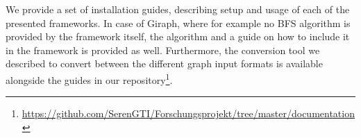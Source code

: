 \documentclass[a4paper]{IEEEtran}
\begin{document}
\appendix
\label{app:installationGuides}\label{app:conversionTool}
We provide a set of installation guides, describing setup and usage of each of the presented frameworks. In case of Giraph, where for example no BFS algorithm is provided by the framework itself, the algorithm and a guide on how to include it in the framework is provided as well. Furthermore, the conversion tool we described to convert between the different graph input formats is available alongside the guides in our repository\footnote{\url{https://github.com/SerenGTI/Forschungsprojekt/tree/master/documentation}}.








%
%
\end{document}

